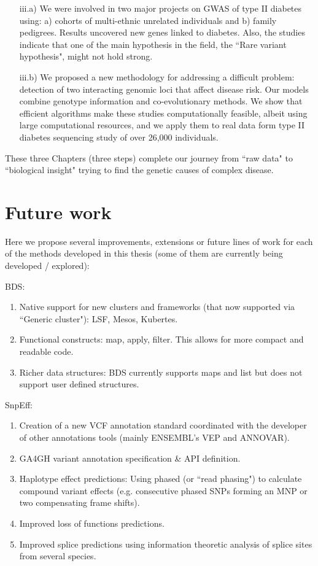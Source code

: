 \begin{itemize}
	\begin{itemize}
	\item[iii.a)] We were involved in two major projects on GWAS of type II diabetes using: a) cohorts of multi-ethnic unrelated individuals and b) family pedigrees. Results uncovered new genes linked to diabetes. Also, the studies indicate that one of the main hypothesis in the field, the ``Rare variant hypothesis", might not hold strong.
	
	\item[iii.b)] We proposed a new methodology for addressing a difficult problem: detection of two interacting genomic loci that affect disease risk. Our models combine genotype information and co-evolutionary methods. We show that efficient algorithms make these studies computationally feasible, albeit using large computational resources, and we apply them to real data form type II diabetes sequencing study of over 26,000 individuals.
	\end{itemize}
\end{itemize}

These three Chapters (three steps) complete our journey from ``raw data" to ``biological insight" trying to find the genetic causes of complex disease.

\section{Future work}

Here we propose several improvements, extensions or future lines of work for each of the methods developed in this thesis (some of them are currently being developed / explored): 

BDS:
\begin{enumerate}
\item Native support for new clusters and frameworks (that now supported via ``Generic cluster"): LSF, Mesos, Kubertes.
\item Functional constructs: map, apply, filter. This allows for more compact and readable code.
\item Richer data structures: BDS currently supports maps and list but does not support user defined structures.
\end{enumerate}

SnpEff:
\begin{enumerate}
\item Creation of a new VCF annotation standard coordinated with the developer of other annotations tools (mainly ENSEMBL’s VEP and ANNOVAR).
\item GA4GH variant annotation specification \& API definition.
\item Haplotype effect predictions: Using phased (or ``read phasing") to calculate compound variant effects (e.g. consecutive phased SNPs forming an MNP or two compensating frame shifts).
\item Improved loss of functions predictions.
\item Improved splice predictions using information theoretic analysis of splice sites from several species.
\end{enumerate}

